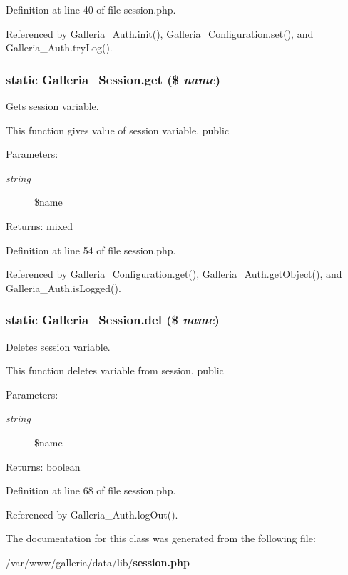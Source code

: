 Definition at line 40 of file session.php.

Referenced by Galleria\_\-Auth.init(), Galleria\_\-Configuration.set(), and Galleria\_\-Auth.tryLog().
\subsubsection{\setlength{\rightskip}{0pt plus 5cm}static Galleria\_\-Session.get (\$ {\em name})\hspace{0.3cm}{\tt  [static]}}\label{classGalleria__Session_aaa2adfd55cd5ac9436625e2760192bc}


Gets session variable.

This function gives value of session variable.  public

\begin{Desc}
\item[Parameters:]
\begin{description}
\item[{\em string}]\$name \end{description}
\end{Desc}
\begin{Desc}
\item[Returns:]mixed \end{Desc}


Definition at line 54 of file session.php.

Referenced by Galleria\_\-Configuration.get(), Galleria\_\-Auth.getObject(), and Galleria\_\-Auth.isLogged().
\subsubsection{\setlength{\rightskip}{0pt plus 5cm}static Galleria\_\-Session.del (\$ {\em name})\hspace{0.3cm}{\tt  [static]}}\label{classGalleria__Session_feda493e43901af5d265cf13e93cd5e5}


Deletes session variable.

This function deletes variable from session.  public

\begin{Desc}
\item[Parameters:]
\begin{description}
\item[{\em string}]\$name \end{description}
\end{Desc}
\begin{Desc}
\item[Returns:]boolean \end{Desc}


Definition at line 68 of file session.php.

Referenced by Galleria\_\-Auth.logOut().

The documentation for this class was generated from the following file:\begin{CompactItemize}
\item 
/var/www/galleria/data/lib/{\bf session.php}\end{CompactItemize}
